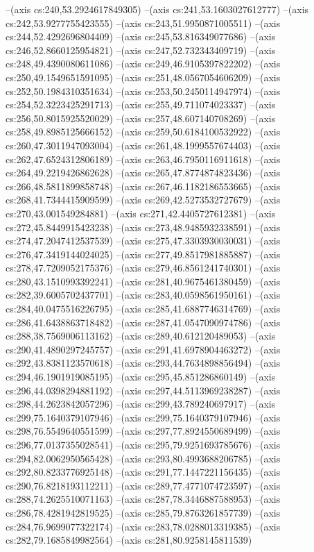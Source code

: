 --(axis cs:240,53.2924617849305)
--(axis cs:241,53.1603027612777)
--(axis cs:242,53.9277755423555)
--(axis cs:243,51.9950871005511)
--(axis cs:244,52.4292696804409)
--(axis cs:245,53.816349077686)
--(axis cs:246,52.8660125954821)
--(axis cs:247,52.732343409719)
--(axis cs:248,49.4390080611086)
--(axis cs:249,46.9105397822202)
--(axis cs:250,49.1549651591095)
--(axis cs:251,48.0567054606209)
--(axis cs:252,50.1984310351634)
--(axis cs:253,50.2450114947974)
--(axis cs:254,52.3223425291713)
--(axis cs:255,49.711074023337)
--(axis cs:256,50.8015925520029)
--(axis cs:257,48.607140708269)
--(axis cs:258,49.8985125666152)
--(axis cs:259,50.6184100532922)
--(axis cs:260,47.3011947093004)
--(axis cs:261,48.1999557674403)
--(axis cs:262,47.6524312806189)
--(axis cs:263,46.7950116911618)
--(axis cs:264,49.2219426862628)
--(axis cs:265,47.8774874823436)
--(axis cs:266,48.5811899858748)
--(axis cs:267,46.1182186553665)
--(axis cs:268,41.7344415909599)
--(axis cs:269,42.5273532727679)
--(axis cs:270,43.001549284881)
--(axis cs:271,42.4405727612381)
--(axis cs:272,45.8449915423238)
--(axis cs:273,48.9485932338591)
--(axis cs:274,47.2047412537539)
--(axis cs:275,47.3303930030031)
--(axis cs:276,47.3419144024025)
--(axis cs:277,49.8517981885887)
--(axis cs:278,47.7209052175376)
--(axis cs:279,46.8561241740301)
--(axis cs:280,43.1510993392241)
--(axis cs:281,40.9675461380459)
--(axis cs:282,39.6005702437701)
--(axis cs:283,40.0598561950161)
--(axis cs:284,40.0475516226795)
--(axis cs:285,41.6887746314769)
--(axis cs:286,41.6438863718482)
--(axis cs:287,41.0547090974786)
--(axis cs:288,38.7569006113162)
--(axis cs:289,40.612120489053)
--(axis cs:290,41.4890297245757)
--(axis cs:291,41.6978904463272)
--(axis cs:292,43.8381123570618)
--(axis cs:293,44.7634898856494)
--(axis cs:294,46.1901919085195)
--(axis cs:295,45.851286860149)
--(axis cs:296,44.0398294881192)
--(axis cs:297,44.5113969238287)
--(axis cs:298,44.2623842057296)
--(axis cs:299,43.789240697917)
--(axis cs:299,75.1640379107946)
--(axis cs:299,75.1640379107946)
--(axis cs:298,76.5549640551599)
--(axis cs:297,77.8924550689499)
--(axis cs:296,77.0137355028541)
--(axis cs:295,79.9251693785676)
--(axis cs:294,82.0062950565428)
--(axis cs:293,80.4993688206785)
--(axis cs:292,80.8233776925148)
--(axis cs:291,77.1447221156435)
--(axis cs:290,76.8218193112211)
--(axis cs:289,77.4771074723597)
--(axis cs:288,74.2625510071163)
--(axis cs:287,78.3446887588953)
--(axis cs:286,78.4281942819525)
--(axis cs:285,79.8763261857739)
--(axis cs:284,76.9699077322174)
--(axis cs:283,78.0288013319385)
--(axis cs:282,79.1685849982564)
--(axis cs:281,80.9258145811539)
